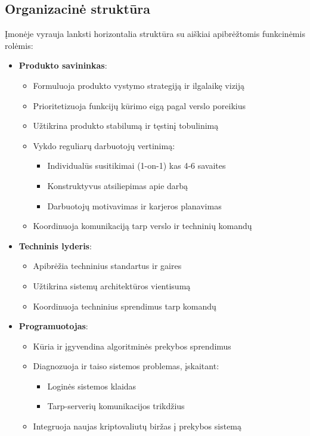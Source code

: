 \documentclass[]{VUMIFTemplateClass}
\begin{document}
\subsection{Organizacinė struktūra}
Įmonėje vyrauja lanksti horizontalia struktūra su aiškiai apibrėžtomis funkcinėmis rolėmis:

\begin{itemize}
\item \textbf{Produkto savininkas}:
\begin{itemize}
\item Formuluoja produkto vystymo strategiją ir ilgalaikę viziją
\item Prioritetizuoja funkcijų kūrimo eigą pagal verslo poreikius
\item Užtikrina produkto stabilumą ir tęstinį tobulinimą
\item Vykdo reguliarų darbuotojų vertinimą:
\begin{itemize}
\item Individualūs susitikimai (1-on-1) kas 4-6 savaites
\item Konstruktyvus atsiliepimas apie darbą
\item Darbuotojų motivavimas ir karjeros planavimas
\end{itemize}
\item Koordinuoja komunikaciją tarp verslo ir techninių komandų
\end{itemize}

\item \textbf{Techninis lyderis}:
\begin{itemize}
\item Apibrėžia techninius standartus ir gaires
\item Užtikrina sistemų architektūros vientisumą
\item Koordinuoja techninius sprendimus tarp komandų
\end{itemize}

\item \textbf{Programuotojas}:
\begin{itemize}
\item Kūria ir įgyvendina algoritminės prekybos sprendimus
\item Diagnozuoja ir taiso sistemos problemas, įskaitant:
\begin{itemize}
\item Loginės sistemos klaidas
\item Tarp-serverių komunikacijos trikdžius
\end{itemize}
\item Integruoja naujas kriptovaliutų biržas į prekybos sistemą
\end{itemize}


\end{itemize}
\end{document}
